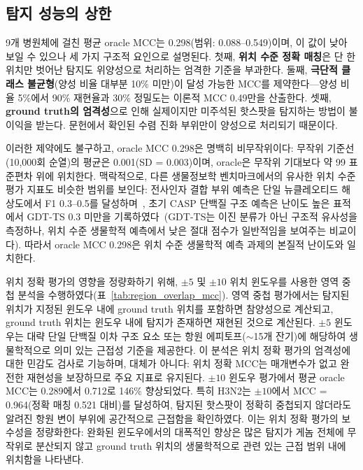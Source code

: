 \subsection{탐지 성능의 상한}
\label{sec:oracle_mcc_ceiling}

9개 병원체에 걸친 평균 oracle MCC는 0.298(범위: 0.088--0.549)이며, 이 값이 낮아 보일 수 있으나 세 가지 구조적 요인으로 설명된다.
첫째, \textbf{위치 수준 정확 매칭}은 단 한 위치만 벗어난 탐지도 위양성으로 처리하는 엄격한 기준을 부과한다.
둘째, \textbf{극단적 클래스 불균형}(양성 비율 대부분 10\% 미만)이 달성 가능한 MCC를 제약한다---양성 비율 5\%에서 90\% 재현율과 30\% 정밀도는 이론적 MCC 0.49만을 산출한다.
셋째, \textbf{ground truth의 엄격성}으로 인해 실제이지만 미주석된 핫스팟을 탐지하는 방법이 불이익을 받는다. 문헌에서 확인된 수렴 진화 부위만이 양성으로 처리되기 때문이다.

이러한 제약에도 불구하고, oracle MCC 0.298은 명백히 비무작위이다: 무작위 기준선(10,000회 순열)의 평균은 0.001(SD = 0.003)이며, oracle은 무작위 기대보다 약 99 표준편차 위에 위치한다.
맥락적으로, 다른 생물정보학 벤치마크에서의 유사한 위치 수준 평가 지표도 비슷한 범위를 보인다: 전사인자 결합 부위 예측은 단일 뉴클레오티드 해상도에서 F1 0.3--0.5를 달성하며~\cite{weirauch2013evaluation}, 초기 CASP 단백질 구조 예측은 난이도 높은 표적에서 GDT-TS 0.3 미만을 기록하였다~\cite{moult2014casp}(GDT-TS는 이진 분류가 아닌 구조적 유사성을 측정하나, 위치 수준 생물학적 예측에서 낮은 절대 점수가 일반적임을 보여주는 비교이다).
따라서 oracle MCC 0.298은 위치 수준 생물학적 예측 과제의 본질적 난이도와 일치한다.

위치 정확 평가의 영향을 정량화하기 위해, $\pm5$ 및 $\pm10$ 위치 윈도우를 사용한 영역 중첩 분석을 수행하였다(표~\ref{tab:region_overlap_mcc}).
영역 중첩 평가에서는 탐지된 위치가 지정된 윈도우 내에 ground truth 위치를 포함하면 참양성으로 계산되고, ground truth 위치는 윈도우 내에 탐지가 존재하면 재현된 것으로 계산된다.
$\pm5$ 윈도우는 대략 단일 단백질 이차 구조 요소 또는 항원 에피토프({$\sim$}15개 잔기)에 해당하여 생물학적으로 의미 있는 근접성 기준을 제공한다. 이 분석은 위치 정확 평가의 엄격성에 대한 민감도 검사로 기능하며, 대체가 아니다: 위치 정확 MCC는 매개변수가 없고 완전한 재현성을 보장하므로 주요 지표로 유지된다.
$\pm10$ 윈도우 평가에서 평균 oracle MCC는 0.289에서 0.712로 146\% 향상되었다.
특히 H3N2는 $\pm10$에서 MCC = 0.964(정확 매칭 0.521 대비)를 달성하여, 탐지된 핫스팟이 정확히 중첩되지 않더라도 알려진 항원 변이 부위에 공간적으로 근접함을 확인하였다.
이는 위치 정확 평가의 보수성을 정량화한다: 완화된 윈도우에서의 대폭적인 향상은 많은 탐지가 게놈 전체에 무작위로 분산되지 않고 ground truth 위치의 생물학적으로 관련 있는 근접 범위 내에 위치함을 나타낸다.

